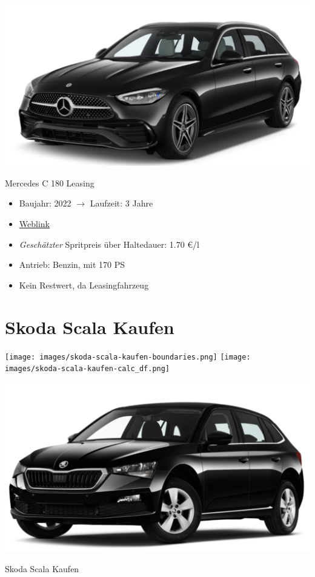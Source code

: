 \documentclass[landscape, DIV=99, 14pt]{scrartcl}
\begin{document}
\pagebreak
\null
\vspace{2cm}
\begin{center}
\includegraphics[width=0.9\columnwidth]{cars/mercedes-c-180-t.png}

Mercedes C 180 Leasing
\end{center}

\begin{itemize}
    \item Baujahr: 2022 $\rightarrow$ Laufzeit: 3 Jahre
    \item \href{https://konfigurator.meinauto.de/mercedes/neuwagen/c-klasse/angebote/c-klasse-t-modell/konfigurator/\#!/preisvergleich/-/8866563/2,47,74,81/private/43735-7309-290394/349/61d36ce4c3067/cash-purchase/73169--190162/48,0,10000,0,0,0,0,0,}{Weblink}
    \item \emph{Gesch\"atzter} Spritpreis \"uber Haltedauer: 1.70 \euro{}/l
    \item Antrieb: Benzin, mit 170 PS
    \item Kein Restwert, da Leasingfahrzeug
\end{itemize}

\pagebreak


\twocolumn

\section*{Skoda Scala Kaufen}
\begin{center}
\texttt{[image: images/skoda-scala-kaufen-boundaries.png]}
\null
\vspace{0.5cm}
\texttt{[image: images/skoda-scala-kaufen-calc\_df.png]}
\end{center}

\pagebreak
\null
\vspace{2cm}
\begin{center}
\includegraphics[width=0.9\columnwidth]{cars/skoda-scala.png}

Skoda Scala Kaufen
\end{center}
\end{document}
